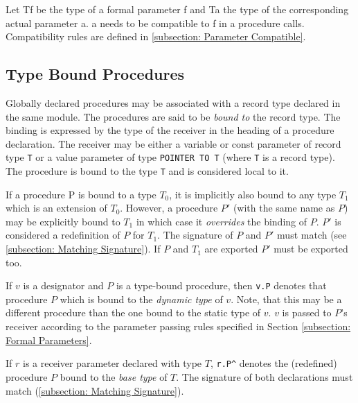 \documentclass[a4wide,11pt]{article}
\begin{document}
Let Tf be the type of a formal parameter f and Ta the type of the corresponding actual parameter a.
a needs to be compatible to f in a procedure calls.
Compatibility rules are defined in \ref{subsection: Parameter Compatible}.


\subsection{Type Bound Procedures}\label{subsection:Type Bound Procedures}

Globally declared procedures may be associated with a record type declared in the same module.
The procedures are said to be \emph{bound to} the record type.
The binding is expressed by the type of the receiver in the heading of a procedure declaration.
The receiver may be either a variable or const parameter of record type \lstinline"T" or a value parameter of type \lstinline"POINTER TO T" (where \lstinline"T" is a record type).
The procedure is bound to the type \lstinline"T" and is considered local to it.

If a procedure P is bound to a type $T_0$, it is implicitly also bound to any type $T_1$ which is an extension of $T_0$.
However, a procedure $P'$ (with the same name as $P$) may be explicitly bound to $T_1$ in which case it \emph{overrides} the binding of $P$. $P'$ is considered a redefinition of $P$ for $T_1$.
The signature of $P$ and $P'$ must match (see \ref{subsection: Matching Signature}).
If $P$ and $T_1$ are exported  $P'$ must be exported too.

If $v$ is a designator and $P$ is a type-bound procedure, then \lstinline"v.P" denotes that procedure $P$ which is bound to the \emph{dynamic type} of $v$.
Note, that this may be a different procedure than the one bound to the static type of $v$. $v$ is passed to $P$'s receiver according to the parameter passing rules specified in Section \ref{subsection: Formal Parameters}.


If $r$ is a receiver parameter declared with type $T$, \lstinline"r.P^" denotes the (redefined) procedure $P$ bound to the \emph{base type} of $T$.
The signature of both declarations must match (\ref{subsection: Matching Signature}).
\end{document}
